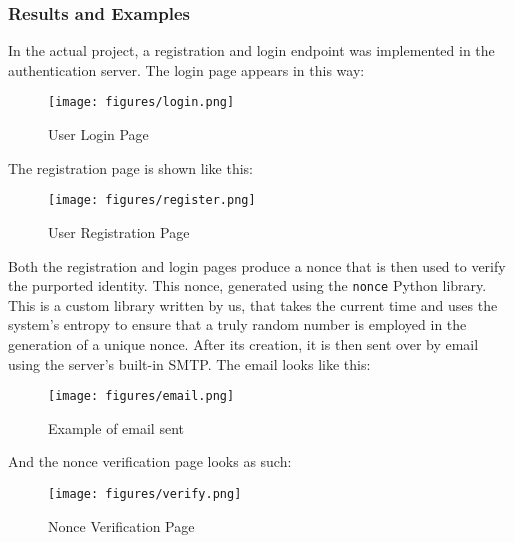 \documentclass[10pt]{article}
\begin{document}
\subsubsection{Results and Examples} \label{section:authentication-results}

In the actual project, a registration and login endpoint was implemented in the authentication server. The login page appears in this way:

\begin{center}
    \begin{figure}[H]
        \centering
        \texttt{[image: figures/login.png]}
            \caption{User Login Page}
        \label{fig:login}
    \end{figure}
\end{center}

The registration page is shown like this:

\begin{center}
    \begin{figure}[H]
        \centering
        \texttt{[image: figures/register.png]}
            \caption{User Registration Page}
        \label{fig:registration}
    \end{figure}
\end{center}


Both the registration and login pages produce a nonce that is then used to verify the purported identity. This nonce, generated using the \texttt{nonce} Python library. This is a custom library written by us, that takes the current time and uses the system's entropy to ensure that a truly random number is employed in the generation of a unique nonce. After its creation, it is then sent over by email using the server's built-in SMTP. The email looks like this:

\begin{center}
    \begin{figure}[H]
        \centering
        \texttt{[image: figures/email.png]}
            \caption{Example of email sent}
        \label{fig:email}
    \end{figure}
\end{center}

And the nonce verification page looks as such:

\begin{center}
    \begin{figure}[H]
        \centering
        \texttt{[image: figures/verify.png]}
            \caption{Nonce Verification Page}
        \label{fig:verification}
    \end{figure}
\end{center}
\end{document}
